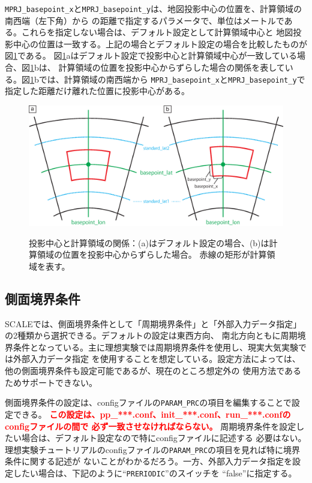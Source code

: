 \noindent \verb|MPRJ_basepoint_x|と\verb|MPRJ_basepoint_y|は、地図投影中心の位置を、計算領域の南西端（左下角）から
の距離で指定するパラメータで、単位はメートルである。これらを指定しない場合は、デフォルト設定として計算領域中心と
地図投影中心の位置は一致する。上記の場合とデフォルト設定の場合を比較したものが図\ref{fig:map_lc}である。
図\ref{fig:map_lc}aはデフォルト設定で投影中心と計算領域中心が一致している場合、図\ref{fig:map_lc}bは、
計算領域の位置を投影中心からずらした場合の関係を表している。図\ref{fig:map_lc}bでは、計算領域の南西端から
\verb|MPRJ_basepoint_x|と\verb|MPRJ_basepoint_y|で指定した距離だけ離れた位置に投影中心がある。

\begin{figure}[t]
\begin{center}
  \includegraphics[width=0.8\hsize]{./figure/LC_latlon_xy.eps}\\
  \caption{投影中心と計算領域の関係：(a)はデフォルト設定の場合、(b)は計算領域の位置を投影中心からずらした場合。
  赤線の矩形が計算領域を表す。}
  \label{fig:map_lc}
\end{center}
\end{figure}


\subsection{側面境界条件} \label{sec:adv_lateralbnd}
SCALEでは、側面境界条件として「周期境界条件」と「外部入力データ指定」の2種類から選択できる。デフォルトの設定は東西方向、
南北方向ともに周期境界条件となっている。主に理想実験では周期境界条件を使用し、現実大気実験では外部入力データ指定
を使用することを想定している。設定方法によっては、他の側面境界条件も設定可能であるが、現在のところ想定外の
使用方法であるためサポートできない。

側面境界条件の設定は、configファイルの\verb|PARAM_PRC|の項目を編集することで設定できる。
\textcolor{red}{\bf この設定は、pp\_***.conf、init\_***.conf、run\_***.confのconfigファイルの間で
必ず一致させなければならない。} 周期境界条件を設定したい場合は、デフォルト設定なので特にconfigファイルに記述する
必要はない。理想実験チュートリアルのconfigファイルの\verb|PARAM_PRC|の項目を見れば特に境界条件に関する記述が
ないことがわかるだろう。一方、外部入力データ指定を設定したい場合は、下記のように``\verb|PRERIODIC|''のスイッチを
``false''に指定する。\\

